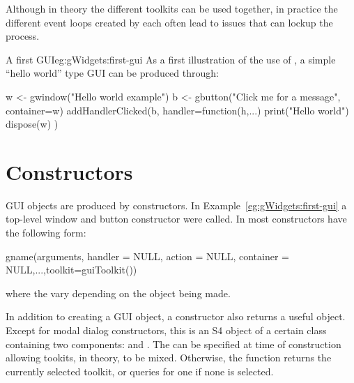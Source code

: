 Although in theory the different toolkits can be used
together, in practice the different event loops created by each often
lead to issues that can lockup the \R\/ process.


\begin{example}{A first GUI}{eg:gWidgets:first-gui}
  As a first illustration of the use of , a
  simple ``hello world'' type GUI can be produced through:
\begin{Schunk}
\begin{Sinput}
 w <- gwindow("Hello world example")
 b <- gbutton("Click me for a message", container=w)
 addHandlerClicked(b, handler=function(h,...) {
   print("Hello world")
   dispose(w)
 })
\end{Sinput}
\end{Schunk}
\end{example}

\section{Constructors}
\label{sec:constructors}
GUI objects are produced by constructors. In
Example~\ref{eg:gWidgets:first-gui} a top-level window and button
constructor were called. In
 most constructors have the following form: 
\begin{Schunk}
\begin{Sinput}
 gname(arguments, handler = NULL, action = NULL, 
       container = NULL,...,toolkit=guiToolkit())
\end{Sinput}
\end{Schunk}
where the  vary depending on the object being made. 



In addition to creating a GUI object, a constructor also returns a
useful \R\/ object. Except for modal dialog constructors, this is an
S4 object of a certain class containing two components: 
and . The  can be specified at time of
construction allowing tookits, in theory, to be mixed. Otherwise, the
 function returns the currently selected toolkit, or
queries for one if none is selected.


